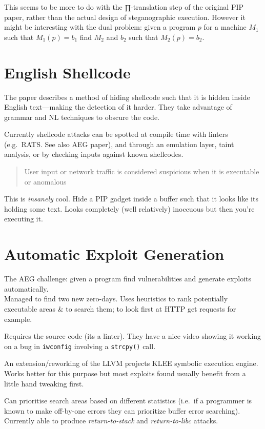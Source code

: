 This seems to be more to do with the ∏-translation step of the original
PIP paper, rather than the actual design of steganographic execution.
However it might be interesting with the dual problem: given a program
$p$ for a machine $M_1$ such that $M_1(p) = b_1$ find $M_2$ and $b_2$
such that $M_2(p) = b_2$.

\section{English Shellcode\citep{Mason2009}}

The paper describes a method of hiding shellcode such that it is hidden
inside English text---making the detection of it harder. They take
advantage of grammar and NL techniques to obscure the code.

Currently shellcode attacks can be spotted at compile time with linters
(e.g.~RATS. See also AEG paper), and through an emulation layer, taint
analysis, or by checking inputs against known shellcodes.

\begin{quote}
User input or network traffic is considered suspicious when it is
executable or anomalous

\end{quote}
This is \emph{insanely} cool. Hide a PIP gadget inside a buffer such
that it looks like its holding some text. Looks completely (well
relatively) inoccuous but then you're executing it.

\section{Automatic Exploit Generation\citep{Avgerinos2011}}

The AEG challenge: given a program find vulnerabilities and generate
exploits automatically.\\Managed to find two new zero-days. Uses
heuristics to rank potentially executable areas \& to search them; to
look first at HTTP get requests for example.

Requires the source code (its a linter). They have a nice video showing
it working on a bug in \texttt{iwconfig} involving a \texttt{strcpy()}
call.

An extension/reworking of the LLVM projects KLEE symbolic execution
engine. Works better for this purpose but most exploits found usually
benefit from a little hand tweaking first.

Can prioritise search areas based on different statistics (i.e.~if a
programmer is known to make off-by-one errors they can prioritize buffer
error searching). Currently able to produce \emph{return-to-stack} and
\emph{return-to-libc} attacks.


